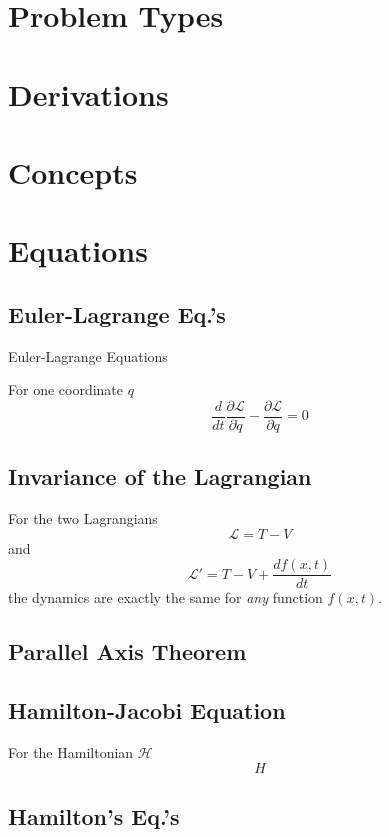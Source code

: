 \documentclass[25pt]{book}
\begin{document}
	
\tableofcontents

\chapter{Problem Types}

\chapter{Derivations}

\chapter{Concepts}

\chapter{Equations}

\section{Euler-Lagrange Eq.'s}

Euler-Lagrange Equations

For one coordinate $q$
\[
\frac{d}{dt} \frac{\partial \mathcal{L}}{\partial \dot{q}} - \frac{\partial \mathcal{L}}{\partial q}= 0
\]

\section{Invariance of the Lagrangian}

For the two Lagrangians 
\[
\mathcal{L} = T - V
\]
and 
\[
\mathcal{L}' = T - V + \frac{d f(x,t)}{dt}
\]
the dynamics are exactly the same for \textit{any} function $f(x,t)$. 

\section{Parallel Axis Theorem}

\section{Hamilton-Jacobi Equation}

For the Hamiltonian $\mathcal{H}$
\[
H
\]

\section{Hamilton's Eq.'s}
\end{document}
